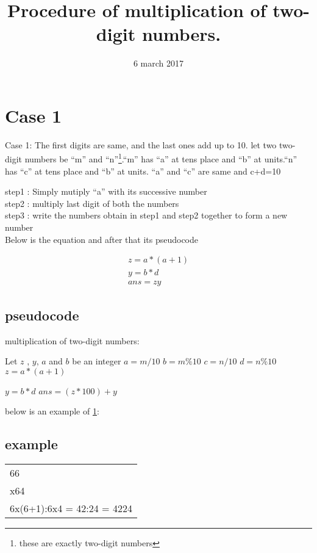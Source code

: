 \documentclass{article}
\title{\huge Procedure of multiplication of two-digit numbers.}
\date{6 march 2017}
\begin{document}
\begin{titlepage}
\maketitle
\end{titlepage}
\newpage
\section{Case 1} \label{case 1}
\noindent Case 1: The first digits are same, and the last ones add up to 10.
let two two-digit numbers be ``m'' and ``n''\footnote{these are exactly two-digit numbers}.``m'' has ``a'' at tens place and ``b'' at units.``n'' has ``c'' at tens place and ``b'' at units. ``a'' and ``c'' are same and c+d=10\cite{athar}

\noindent step1 : Simply mutiply ``a'' with its successive number \\
step2 : multiply last digit of both the numbers \\
step3 : write the numbers obtain in step1 and step2 together to form a new number\\

\noindent Below is the equation and after that its pseudocode


\begin{align*}
	z=a*(a+1)  \\
	y=b*d \\
	ans=zy
	\end{align*}
\subsection{pseudocode}
  \begin{algorithm}
   \caption{multiplication of two-digit numbers: }
    \begin{algorithmic}[1]
	\State 

	\State Let $z$ , $y$, $a$ and $b$ be an integer
\State $a=m/10$
\State $b=m\%10$
\State $c=n/10$
\State $d=n\%10$
	\State $z=a*(a+1)$
	
	\State $y=b*d$
	\State $ans=(z*100)+y$ 
	
	\EndIf
	\EndFunction
\end{algorithmic}
\end{algorithm}
\noindent below is an example of \ref{case 1}:
\newline
\subsection{example}
\begin{tabular}{l} 
66\\

x64\\

6x(6+1):6x4 = 42:24 = 4224\\
\end{tabular}
\end{document}
